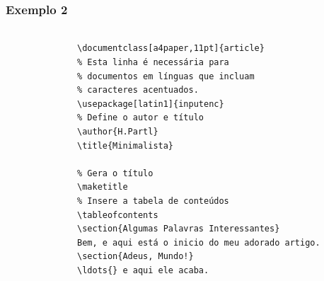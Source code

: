 \begin{frame}[fragile]
\frametitle{Exemplo 2}
\framesubtitle{}
  \scriptsize
  \begin{columns}[c]
  \begin{figure}[h!]
  \centering
  \setlength\fboxsep{0pt}
  \setlength\fboxrule{0.5pt}
  \label{fig:minimal2}
  \end{figure}
\begin{verbatim}
\documentclass[a4paper,11pt]{article}
% Esta linha é necessária para
% documentos em línguas que incluam
% caracteres acentuados.
\usepackage[latin1]{inputenc}
% Define o autor e título
\author{H.Partl}
\title{Minimalista}

% Gera o título
\maketitle
% Insere a tabela de conteúdos
\tableofcontents
\section{Algumas Palavras Interessantes}
Bem, e aqui está o inicio do meu adorado artigo.
\section{Adeus, Mundo!}
\ldots{} e aqui ele acaba.

\end{verbatim}
  \end{columns}
\end{frame}


